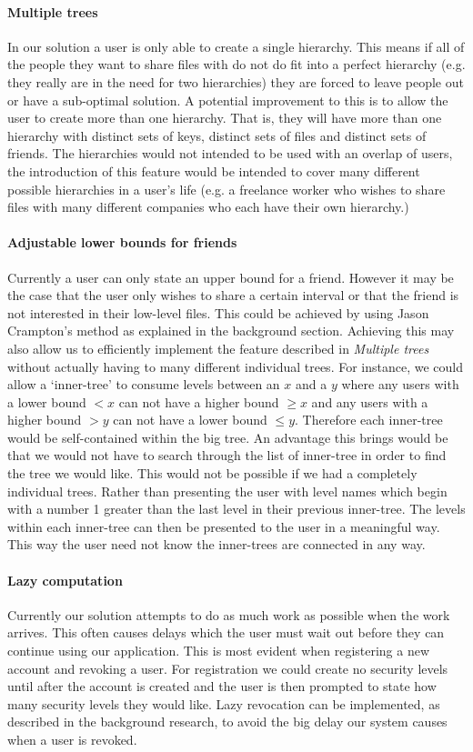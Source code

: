 \documentclass[12pt, titlepage]{article}
\begin{document}
\paragraph*{Multiple trees} In our solution a user is only able to create a single hierarchy. This means if all of the people they want to share files with do not do fit into a perfect hierarchy (e.g. they really are in the need for two hierarchies) they are forced to leave people out or have a sub-optimal solution. A potential improvement to this is to allow the user to create more than one hierarchy. That is, they will have more than one hierarchy with distinct sets of keys, distinct sets of files and distinct sets of friends. The hierarchies would not intended to be used with an overlap of users, the introduction of this feature would be intended to cover many different possible hierarchies in a user's life (e.g. a freelance worker who wishes to share files with many different companies who each have their own hierarchy.)
\paragraph*{Adjustable lower bounds for friends} Currently a user can only state an upper bound for a friend. However it may be the case that the user only wishes to share a certain interval or that the friend is not interested in their low-level files. This could be achieved by using Jason Crampton's method as explained in the background section. Achieving this may also allow us to efficiently implement the feature described in \textit{Multiple trees} without actually having to many different individual trees. For instance, we could allow a `inner-tree' to consume levels between an $x$ and a $y$ where any users with a lower bound $< x$ can not have a higher bound $\geq x$ and any users with a higher bound $> y$ can not have a lower bound $\leq y$. Therefore each inner-tree would be self-contained within the big tree. An advantage this brings would be that we would not have to search through the list of inner-tree in order to find the tree we would like. This would not be possible if we had a completely individual trees.
\newline \indent Rather than presenting the user with level names which begin with a number 1 greater than the last level in their previous inner-tree. The levels within each inner-tree can then be presented to the user in a meaningful way. This way the user need not know the inner-trees are connected in any way.
\paragraph*{Lazy computation} Currently our solution attempts to do as much work as possible when the work arrives. This often causes delays which the user must wait out before they can continue using our application. This is most evident when registering a new account and revoking a user. For registration we could create no security levels until after the account is created and the user is then prompted to state how many security levels they would like. Lazy revocation can be implemented, as described in the background research, to avoid the big delay our system causes when a user is revoked.
\end{document}
